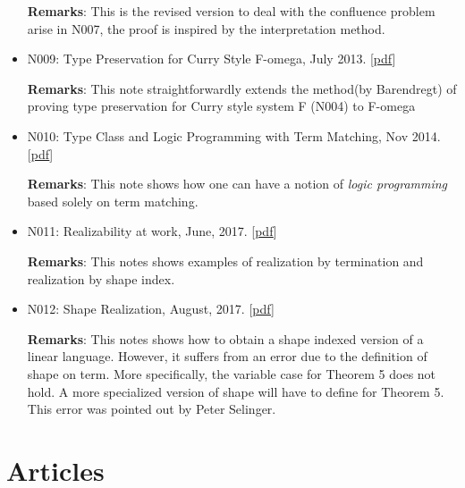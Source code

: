 \documentclass[10pt]{article}
\begin{document}
\begin{itemize}
\noindent \textbf{Remarks}: This is the revised version to deal with the confluence problem arise in N007, the proof is inspired by the interpretation method. 

\item N009: Type Preservation for Curry Style F-omega, July 2013. [\href{../../document/notes/fomega-presv.pdf}{pdf}]

\noindent \textbf{Remarks}: This note straightforwardly extends the method(by Barendregt) of proving type preservation for Curry style system F (N004) to F-omega

\item N010: Type Class and Logic Programming with Term Matching, Nov 2014. [\href{../../document/notes/tm.pdf}{pdf}]

\noindent \textbf{Remarks}: This note shows how one can have a notion of \textit{logic programming} based solely on term matching. 

\item N011: Realizability at work,  June, 2017. [\href{../../document/notes/realization.pdf}{pdf}]

  \noindent \textbf{Remarks}: This notes shows examples of realization by termination and realization by shape index. 

\item N012: Shape Realization,  August, 2017. [\href{../../document/notes/shape-real.pdf}{pdf}]

  \noindent \textbf{Remarks}: This notes shows how to obtain a shape indexed version of a linear language. However, it suffers from an error due to the definition of shape on term. More specifically, the variable case for Theorem 5 does not hold. A more specialized version of shape will
  have to define for Theorem 5. This error was pointed out by Peter Selinger.
  

  
\end{itemize}

\section*{Articles}
\end{document}
